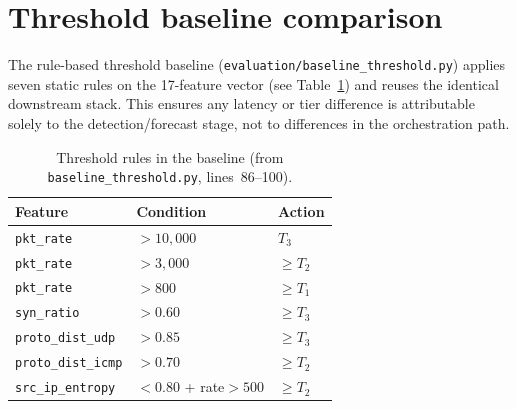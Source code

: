 \section{Threshold baseline comparison}
\label{sec:baseline}

The rule-based threshold baseline (\texttt{evaluation/baseline\_threshold.py})
applies seven static rules on the 17-feature vector (see
Table~\ref{tab:baseline-rules}) and reuses the identical downstream
stack. This ensures any latency or tier difference is attributable
solely to the detection/forecast stage, not to differences in the
orchestration path.

\begin{table}[H]
\centering
\small
\caption{Threshold rules in the baseline (from \texttt{baseline\_threshold.py}, lines~86--100).}
\label{tab:baseline-rules}
\begin{tabular}{@{}lll@{}}
\toprule
Feature & Condition & Action \\
\midrule
\texttt{pkt\_rate}        & $> 10{,}000$   & $T_3$ \\
\texttt{pkt\_rate}        & $> 3{,}000$    & $\geq T_2$ \\
\texttt{pkt\_rate}        & $> 800$        & $\geq T_1$ \\
\texttt{syn\_ratio}       & $> 0.60$       & $\geq T_3$ \\
\texttt{proto\_dist\_udp} & $> 0.85$       & $\geq T_3$ \\
\texttt{proto\_dist\_icmp}& $> 0.70$       & $\geq T_2$ \\
\texttt{src\_ip\_entropy} & $< 0.80$ + rate$>500$ & $\geq T_2$ \\
\bottomrule
\end{tabular}
\end{table}

